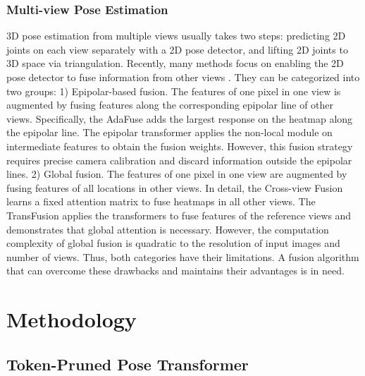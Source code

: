 \documentclass[runningheads]{llncs}
\begin{document}
\subsubsection{Multi-view Pose Estimation}  
3D pose estimation from multiple views usually takes two steps: predicting 2D joints on each view separately with a 2D pose detector, and lifting 2D joints to 3D space via triangulation. 
Recently, many methods focus on enabling the 2D pose detector to fuse information from other views \cite{qiu2019cross,zhang2021adafuse,xie2020metafuse,he2020epipolar,ma2021transfusion}. 
They can be categorized into two groups: 
1) Epipolar-based fusion. The features of one pixel in one view is augmented by fusing features along the corresponding epipolar line of other views. 
Specifically, the AdaFuse \cite{zhang2021adafuse} adds the largest response on the heatmap along the epipolar line. 
The epipolar transformer \cite{he2020epipolar} applies the non-local module \cite{wang2018non} on intermediate features to obtain the fusion weights. 
However, this fusion strategy requires precise camera calibration and discard information outside the epipolar lines.
2) Global fusion. The features of one pixel in one view are augmented by fusing features of all locations in other views. 
In detail, the Cross-view Fusion \cite{qiu2019cross} learns a fixed attention matrix to fuse heatmaps in all other views. 
The TransFusion \cite{ma2021transfusion} applies the transformers to fuse features of the reference views and demonstrates that global attention is necessary. 
However, the computation complexity of global fusion is quadratic to the resolution of input images and number of views. 
Thus, both categories have their limitations. A fusion algorithm that can overcome these drawbacks and maintains their advantages is in need.









\vspace{-0.5em}
\section{Methodology}
\vspace{-0.5em}


\subsection{Token-Pruned Pose Transformer}
\label{sec:PPT_method}
\end{document}
